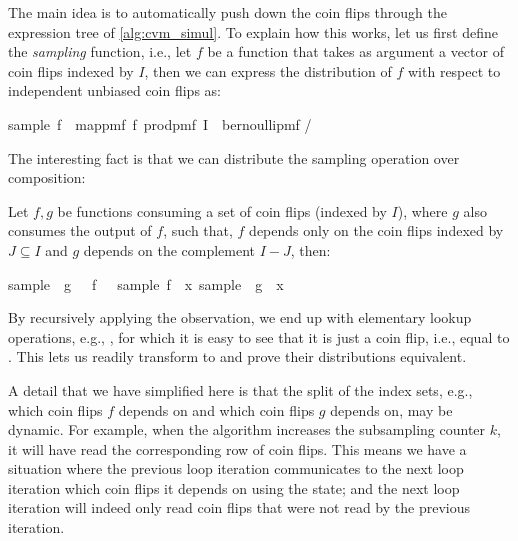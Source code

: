 The main idea is to automatically push down the coin flips through the expression tree of \cref{alg:cvm_simul}.
To explain how this works, let us first define the \emph{sampling} function, i.e., let $f$ be a function that takes as argument a vector of coin flips indexed by $I$, then we can express the distribution of $f$ with respect to independent unbiased coin flips as:
\begin{isabelle_cm}
  sample\ f\ \isacharequal\ map{\isacharunderscore}pmf\ f\ {\isacharparenleft}prod{\isacharunderscore}pmf\ I\ {\isacharparenleft}\isasymlambda\isacharunderscore\isachardot\ bernoulli{\isacharunderscore}pmf \isacharparenleft{}/\isacharparenright\isacharparenright\isacharparenright
\end{isabelle_cm}
The interesting fact is that we can distribute the sampling operation over composition:
\begin{observation}\label{o:sample_distrib} Let $f,g$ be functions consuming a set of coin flips (indexed by $I$), where $g$ also consumes the output of $f$, such that,
$f$ depends only on the coin flips indexed by $J \subseteq I$ and $g$ depends on the complement $I - J$, then:
\begin{isabelle_cm}
  sample\ \isacharparenleft\isasymlambda\isasymomega\isachardot\ g\ \isasymomega\ \isasymcirc\ f\ \isasymomega{\isacharparenright}\ \isacharequal\ sample\ f\ \isasymbind\ \isacharparenleft{\isasymlambda}x\isachardot\ sample\ \isacharparenleft\isasymlambda\isasymomega\isachardot\ g\ \isasymomega\ x\isacharparenright\isacharparenright
\end{isabelle_cm}
\end{observation}
By recursively applying the observation, we end up with elementary lookup operations, e.g., , for which it is easy to see that it is just a coin flip, i.e., equal to .
This lets us readily transform  to  and prove their distributions equivalent.

A detail that we have simplified here is that the split of the index sets, e.g., which coin flips $f$ depends on and which coin flips $g$ depends on, may be dynamic.
For example, when the algorithm increases the subsampling counter $k$, it will have read the corresponding row of coin flips.
This means we have a situation where the previous loop iteration communicates to the next loop iteration which coin flips it depends on using the state; and the next loop iteration will indeed only read coin flips that were not read by the previous iteration.

